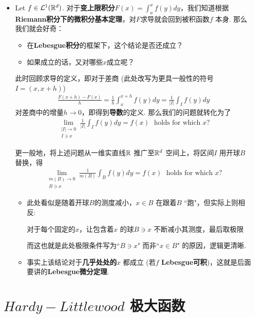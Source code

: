 	\begin{itemize}
		\item Let $f \in \mathcal{L}^{1}(\mathbb{R}^d)$. 对于\textbf{变上限积分}$F(x) = \int_{a}^{x}{f(y) dy}$，我们知道根据\textbf{Riemann积分下的微积分基本定理}，对$F$求导就会回到被积函数$f$ 本身. 那么我们就会好奇：
		
		\vspace{1em}
		
		\begin{itemize}
			\item 在\textbf{Lebesgue积分}的框架下，这个结论是否还成立？
			
			\item 如果成立的话，又对哪些$x$成立呢？
		\end{itemize}
	
		\vspace{1em}
		
		此时回顾求导的定义，即对于差商 (此处改写为更具一般性的符号$I = (x , x + h)$)
		\begin{align}
			\frac{F(x + h) - F(x)}{h} 
			= \frac{1}{h} \int_{x}^{x + h}{f(y) dy} 
			= \frac{1}{\left| I \right|} \int_{I}{f(y) dy}
		\end{align}
		对差商中的增量$h \to 0$，即得到\textbf{导数}的定义. 那么我们的问题就转化为了
		\begin{align}
			\lim_{\substack{\left| I \right| \to 0 \\ I \ni x}}{\frac{1}{\left| I \right|} \int_{I}{f(y) dy}}
			= f(x) 
			\,\,\,\, \text{holds for which $x$?}
		\end{align}
	
		\vspace{1em}
		
		更一般地，将上述问题从一维实直线$\mathbb{R}$ 推广至$\mathbb{R}^d$ 空间上，将区间$I$ 用开球$B$ 替换，得
		\begin{align}
			\lim_{\substack{m(B) \to 0 \\ B \ni x}}{\frac{1}{m(B)} \int_{B}{f(y) dy}}
			= f(x)
			\,\,\,\, \text{holds for which $x$?}
		\end{align}
	
		\vspace{1em}
		
		\begin{rmk}
			\begin{itemize}
				\item 此处看似是随着开球$B$的测度减小，$x \in B$ 在跟着$B$ ``跑"，但实际上则相反:
				\begin{center}
					对于每个固定的$x$，让包含着$x$ 的球$B \ni x$ 不断减小其测度，最后取极限 
				\end{center}	
				而这也就是此处极限条件写为``$B \ni x$" 而非``$x \in B$" 的原因，逻辑更清晰.
				
				\vspace{1em}
				
				\item 事实上该结论对于\textbf{几乎处处的$x$} 都成立 (若$f$ \textbf{Lebesgue可积})，这就是后面要讲的\textbf{Lebesgue微分定理}.
			\end{itemize}
		\end{rmk}
	\end{itemize}
	
\newpage
\section{$Hardy-Littlewood$ 极大函数}



	\ifx\allfiles\undefined

\fi